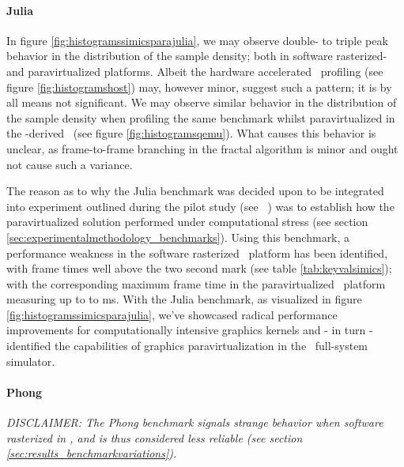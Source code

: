 \paragraph{Julia}
\label{par:results_julia}
In figure \ref{fig:histogramssimicsparajulia}, we may observe double- to triple peak behavior in the distribution of the sample density; both in software rasterized- and paravirtualized platforms.
Albeit the hardware accelerated \dvttermhost\ profiling (see figure \ref{fig:histogramshost}) may, however minor, suggest such a pattern; it is by all means not significant.
We may observe similar behavior in the distribution of the sample density when profiling the same benchmark whilst paravirtualized in the \dvttermqemu -derived \dvttermandroidemulator\ (see figure \ref{fig:histogramsqemu}).
What causes this behavior is unclear, as frame-to-frame branching in the fractal algorithm is minor and ought not cause such a variance.

The reason as to why the Julia benchmark was decided upon to be integrated into experiment outlined during the pilot study (see ~) was to establish how the paravirtualized solution performed under computational stress (see section \ref{sec:experimentalmethodology_benchmarks}).
Using this benchmark, a performance weakness in the software rasterized \dvttermsimics\ platform has been identified, with frame times well above the two second mark (see table \ref{tab:keyvalsimics}); with the corresponding maximum frame time in the paravirtualized \dvttermsimics\ platform measuring up to to  ms.
With the Julia benchmark, as visualized in figure \ref{fig:histogramssimicsparajulia}, we've showcased radical performance improvements for computationally intensive graphics kernels and - in turn - identified the capabilities of graphics paravirtualization in the \dvttermsimics\ full-system simulator. %




\paragraph{Phong}
\label{par:results_phong}
\textit{DISCLAIMER: The Phong benchmark signals strange behavior when software rasterized in \dvttermsimics , and is thus considered less reliable (see section \ref{sec:results_benchmarkvariations}).}\\

